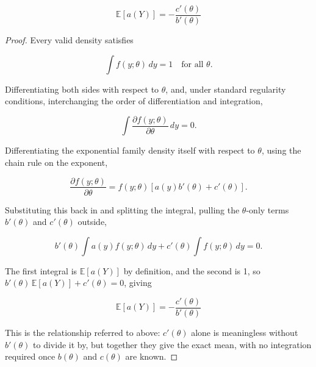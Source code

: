 \begin{theorem}
\begin{mathbox}
\[
\mathbb{E}[a(Y)] = -\frac{c'(\theta)}{b'(\theta)}
\]
\end{mathbox}
\end{theorem}
\begin{proof}
Every valid density satisfies
\begin{mathbox}
\[
\int f(y;\theta)\,dy = 1 \quad\text{for all }\theta.
\]
\end{mathbox}
Differentiating both sides with respect to $\theta$, and, under standard regularity conditions, interchanging the order of differentiation and integration,
\begin{mathbox}
\[
\int \frac{\partial f(y;\theta)}{\partial\theta}\,dy = 0.
\]
\end{mathbox}
Differentiating the exponential family density itself with respect to $\theta$, using the chain rule on the exponent,
\begin{mathbox}
\[
\frac{\partial f(y;\theta)}{\partial\theta} = f(y;\theta)\left[a(y)b'(\theta) + c'(\theta)\right].
\]
\end{mathbox}
Substituting this back in and splitting the integral, pulling the $\theta$-only terms $b'(\theta)$ and $c'(\theta)$ outside,
\begin{mathbox}
\[
b'(\theta)\int a(y)f(y;\theta)\,dy + c'(\theta)\int f(y;\theta)\,dy = 0.
\]
\end{mathbox}
The first integral is $\mathbb{E}[a(Y)]$ by definition, and the second is 1, so $b'(\theta)\,\mathbb{E}[a(Y)]+c'(\theta) = 0$, giving
\begin{mathbox}
\[
\mathbb{E}[a(Y)] = -\frac{c'(\theta)}{b'(\theta)}
\]
\end{mathbox}
This is the relationship referred to above: $c'(\theta)$ alone is meaningless without $b'(\theta)$ to divide it by, but together they give the exact mean, with no integration required once $b(\theta)$ and $c(\theta)$ are known.
\end{proof}

